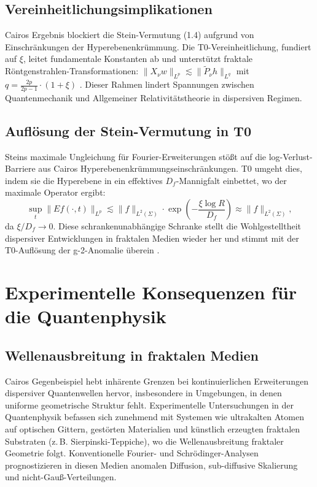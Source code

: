 	\subsection{Vereinheitlichungsimplikationen}
	
	Cairos Ergebnis blockiert die Stein-Vermutung (1.4) aufgrund von Einschränkungen der Hyperebenenkrümmung. Die T0-Vereinheitlichung, fundiert auf $\xi$, leitet fundamentale Konstanten ab und unterstützt fraktale Röntgenstrahlen-Transformationen: $\|X_\nu w\|_{L^p} \lesssim \|\tilde{P}_\nu h\|_{L^q}$ mit $q = \frac{2p}{2p-1} \cdot (1 + \xi)$ \cite{T0_netze_en}. Dieser Rahmen lindert Spannungen zwischen Quantenmechanik und Allgemeiner Relativitätstheorie in dispersiven Regimen.
	
	\subsection{Auflösung der Stein-Vermutung in T0}
	
	Steins maximale Ungleichung für Fourier-Erweiterungen stößt auf die log-Verlust-Barriere aus Cairos Hyperebenenkrümmungseinschränkungen. T0 umgeht dies, indem sie die Hyperebene in ein effektives $D_f$-Mannigfalt einbettet, wo der maximale Operator ergibt:
	\begin{equation}
		\sup_t \|Ef(\cdot, t)\|_{L^p} \lesssim \|f\|_{L^2(\Sigma)} \cdot \exp\left(-\frac{\xi \log R}{D_f}\right) \approx \|f\|_{L^2(\Sigma)},
	\end{equation}
	da $\xi / D_f \to 0$. Diese schrankenunabhängige Schranke stellt die Wohlgestelltheit dispersiver Entwicklungen in fraktalen Medien wieder her und stimmt mit der T0-Auflösung der g-2-Anomalie überein \cite{T0_g2_erweiterung}.
	
	\section{Experimentelle Konsequenzen für die Quantenphysik}
	
	\subsection{Wellenausbreitung in fraktalen Medien}
	
	Cairos Gegenbeispiel hebt inhärente Grenzen bei kontinuierlichen Erweiterungen dispersiver Quantenwellen hervor, insbesondere in Umgebungen, in denen uniforme geometrische Struktur fehlt. Experimentelle Untersuchungen in der Quantenphysik befassen sich zunehmend mit Systemen wie ultrakalten Atomen auf optischen Gittern, gestörten Materialien und künstlich erzeugten fraktalen Substraten (z.\,B. Sierpinski-Teppiche), wo die Wellenausbreitung fraktaler Geometrie folgt. Konventionelle Fourier- und Schrödinger-Analysen prognostizieren in diesen Medien anomalen Diffusion, sub-diffusive Skalierung und nicht-Gauß-Verteilungen.
	
